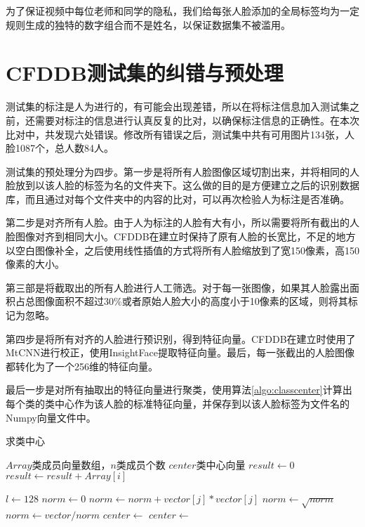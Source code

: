 为了保证视频中每位老师和同学的隐私，我们给每张人脸添加的全局标签均为一定规则生成的独特的数字组合而不是姓名，以保证数据集不被滥用。

\section{CFDDB测试集的纠错与预处理}

测试集的标注是人为进行的，有可能会出现差错，所以在将标注信息加入测试集之前，还需要对标注的信息进行认真反复的比对，以确保标注信息的正确性。在本次比对中，共发现六处错误。修改所有错误之后，测试集中共有可用图片134张，人脸1087个，总人数84人。

测试集的预处理分为四步。第一步是将所有人脸图像区域切割出来，并将相同的人脸放到以该人脸的标签为名的文件夹下。这么做的目的是方便建立之后的识别数据库，而且通过对每个文件夹中的内容的比对，可以再次检验人为标注是否准确。

第二步是对齐所有人脸。由于人为标注的人脸有大有小，所以需要将所有截出的人脸图像对齐到相同大小。CFDDB在建立时保持了原有人脸的长宽比，不足的地方以空白图像补全，之后使用线性插值的方式将所有人脸缩放到了宽150像素，高150像素的大小。

第三部是将截取出的所有人脸进行人工筛选。对于每一张图像，如果其人脸露出面积占总图像面积不超过$30\%$或者原始人脸大小的高度小于10像素的区域，则将其标记为忽略。

第四步是将所有对齐的人脸进行预识别，得到特征向量。CFDDB在建立时使用了MtCNN\cite{zhang2016joint}进行校正，使用InsightFace\cite{deng2018arcface}提取特征向量。最后，每一张截出的人脸图像都转化为了一个256维的特征向量。

最后一步是对所有抽取出的特征向量进行聚类，使用算法\ref{algo:classcenter}计算出每个类的类中心作为该人脸的标准特征向量，并保存到以该人脸标签为文件名的Numpy向量文件中。

\begin{algorithm}
	\caption{求类中心}
	\label{algo:classcenter}
	\begin{algorithmic}[1] %
		\Require $Array$类成员向量数组，$n$类成员个数 %
		\Ensure $center$类中心向量 %
		\State $result \gets 0$
		\State $result \gets result + Array[i]$
		\EndFor
	\end{algorithmic}
\end{algorithm}

\begin{algorithm}
	\begin{algorithmic}[1]
		\State {}
		\EndFunction
		\State
		\State $l\gets 128$
		\State $norm\gets 0$
		\State $norm\gets norm + vector[j] * vector[j]$
		\EndFor
		\State $norm\gets \sqrt{norm}$
		\State $norm\gets vector / norm$
		\State {}
		\EndFunction
		\State
		\State $center\gets $
		\State $center\gets $
		\State {}
		\EndFunction
	\end{algorithmic}
\end{algorithm}

